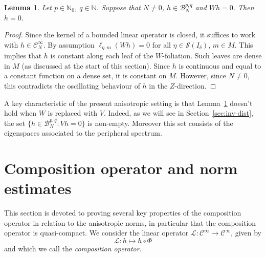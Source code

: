 \documentclass[a4paper,11pt]{amsart}
\newtheorem{lemma}[theorem]{Lemma}
\theoremstyle{remark}
\newcommand{\cB}{\mathcal{B}} %
\newcommand{\cC}{\mathcal{C}} %
\newcommand{\cS}{\mathcal{S}} %
\newcommand{\cL}{\mathcal{L}} %
\newcommand{\bN}{\mathbb{N}} %
\newcommand{\dv}{V} %
\newcommand{\dw}{W} %
\newcommand{\dz}{Z} %
\begin{document}
\begin{lemma}
    \label{lem:ker-W}
    Let \(p \in \bN_0\), \(q \in \bN\).
    Suppose that \(N \neq 0\), \(h\in \cB^{p,q}_{N}\) and \(\dw h = 0\).
    Then \(h = 0\).
\end{lemma}

\begin{proof}
    Since the kernel of a bounded linear operator is closed, it suffices to work with \(h\in \cC_N^\infty\).
    By assumption $\ell_{\eta,m}(\dw h)=0$ for all \(\eta\in \cS(I_{\delta})\), \(m\in M\).
    This implies that \(h\) is constant along each leaf of the \(\dw\)-foliation. 
    Such leaves are dense in \(M\) (as discussed at the start of this section).
    Since \(h\) is continuous and equal to a constant function on a dense set, it is constant on \(M\).
    However, since \(N\neq 0\), this contradicts the oscillating behaviour of \(h\) in the \(\dz\)-direction.
\end{proof}

A key characteristic of the present anisotropic setting is that Lemma~\ref{lem:ker-W} doesn't hold when \(\dw\) is replaced with \(\dv\).
Indeed, as we will see in Section~\ref{sec:inv-dist}, the set \(\{h \in \cB^{p,q}_{N} : \dv h = 0\}\) is non-empty.
Moreover this set consists of the eigenspaces associated to the peripheral spectrum.


\section{Composition operator and norm estimates}
\label{sec:norm-est}

This section is devoted to proving several key properties of the composition operator in relation to the anisotropic norms, in particular that the composition operator is quasi-compact.
We consider the linear operator \(\cL : \cC^\infty \to \cC^\infty\), given by
\begin{equation}
    \label{eq:def-L}
    \cL : h \mapsto h \circ \Phi
\end{equation}
and which we call the \emph{composition operator}. 
\end{document}
